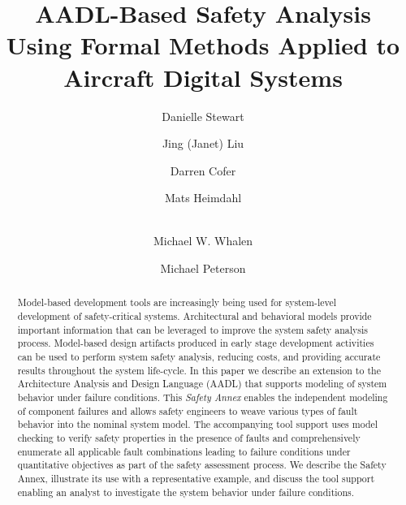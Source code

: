 \documentclass{llncs}
\begin{document}
\newcommand{\stateequiv}{\equiv_{s}}
\newcommand{\traceequiv}{\equiv_{\sigma}}
\newcommand{\ta}{\text{TA}}
\newcommand{\cta}{\text{TA$_{C}$}}
\newcommand{\tta}{\text{TA$_{T}$}}
\newcommand{\ucalg}{\texttt{\small{IVC\_UC}}}
\newcommand{\ucbfalg}{\texttt{\small{IVC\_UCBF}}}


\title{AADL-Based Safety Analysis Using Formal Methods Applied to Aircraft Digital Systems}
%
\author{Danielle Stewart
\and Jing (Janet) Liu
\and Darren Cofer
\and Mats Heimdahl
\and \\ Michael W. Whalen
\and Michael Peterson}
\maketitle

\begin{abstract}
Model-based development tools are increasingly being used 
for system-level development of safety-critical systems. Architectural 
and behavioral models  provide important information 
that can be leveraged to improve the system
safety analysis process. Model-based design artifacts 
produced in early stage development activities can be used to perform system safety analysis,
reducing costs, and providing accurate results throughout
the system life-cycle.  In this paper we describe an extension 
to the Architecture Analysis and Design Language (AADL) that 
supports modeling of system behavior under failure conditions. This 
\emph{Safety Annex} enables the independent modeling of component 
failures and allows safety engineers to weave various types of 
fault behavior into the nominal system model. The accompanying tool support uses model checking to verify safety properties in the presence of faults and comprehensively enumerate all applicable fault combinations leading to failure conditions
under quantitative objectives as part of the safety assessment process.  
We describe the Safety Annex, illustrate its use with a representative 
example, and discuss the tool support enabling an 
analyst to investigate the system behavior under failure conditions.	
	

\end{abstract}
\end{document}
